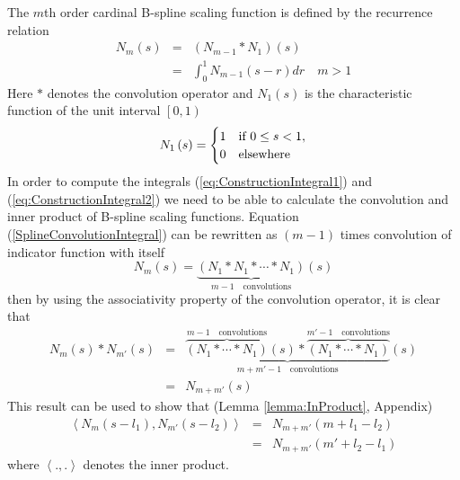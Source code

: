 \documentclass[11pt,draftcls,onecolumn,peerreview]{IEEEtran}
\begin{document}
The  $m$th order cardinal B-spline scaling function is defined by the recurrence relation \cite{Chui1992} 
\begin{eqnarray}
N_{m}\left(s\right)&=&\left(N_{m-1}\ast N_{1}\right)\left(s\right)\nonumber \\
&=&\int_0^{1} N_{m-1}\left( s-r\right)dr \quad m>1 
\label{SplineConvolutionIntegral}
\end{eqnarray}
Here $\ast$ denotes the convolution operator and $N_1\left(s\right)$ is the characteristic function of the unit interval  $\left[ 0,1\right) $
\begin{equation}
N_{1}\left(s\right)=
\begin{cases}
1 & \text{if $ 0\le s<1$}, \\
0 & \mathrm{elsewhere}
\end{cases}
\end{equation}
In order to compute the  integrals (\ref{eq:ConstructionIntegral1}) and (\ref{eq:ConstructionIntegral2}) we need to be able to calculate the convolution and inner product of B-spline scaling functions. Equation (\ref{SplineConvolutionIntegral}) can be rewritten as $(m-1)$ times convolution of indicator function with itself 
\begin{equation}
 N_{m}\left(s\right)=\underbrace{\left(N_{1}\ast N_{1}\ast \cdots \ast N_{1}\right)}_{m-1\quad \text{convolutions}}\left(s\right)
\end{equation}
then by using the associativity property of the convolution operator, it is clear that
\setlength{\arraycolsep}{0.0em}
\begin{eqnarray}
N_{m}\left(s\right) \ast N_{m'}\left(s\right)&=&\underbrace{\overbrace{\left(N_{1} \ast \cdots \ast N_{1}\right)}^{m-1 \quad \text{convolutions}}\left(s\right) \ast \overbrace{\left(N_{1} \ast \cdots \ast N_{1}\right)}^{m'-1\quad \text{convolutions}}}_{m+m'-1 \quad \text{convolutions}}\left(s\right)\nonumber\\
&=&N_{m+m'}\left(s\right)
\label{eq:BsplineConvolution}
\end{eqnarray}
\setlength{\arraycolsep}{5pt}
This result can be used to show that (Lemma \ref{lemma:InProduct}, Appendix)
\setlength{\arraycolsep}{0.0em}
\begin{eqnarray}
 \left\langle N_{m}\left(s-l_{1}\right), N_{m'}\left(s-l_{2}\right)\right\rangle&=&N_{m+m'}\left(m+l_{1}-l_{2}\right)\nonumber \\
&=&N_{m+m'}\left(m'+l_{2}-l_{1}\right)
\label{eq:BsplineInnerProduct}
\end{eqnarray}
\setlength{\arraycolsep}{5pt}
where $\left\langle  .,.\right\rangle $ denotes the inner product.
\end{document}

